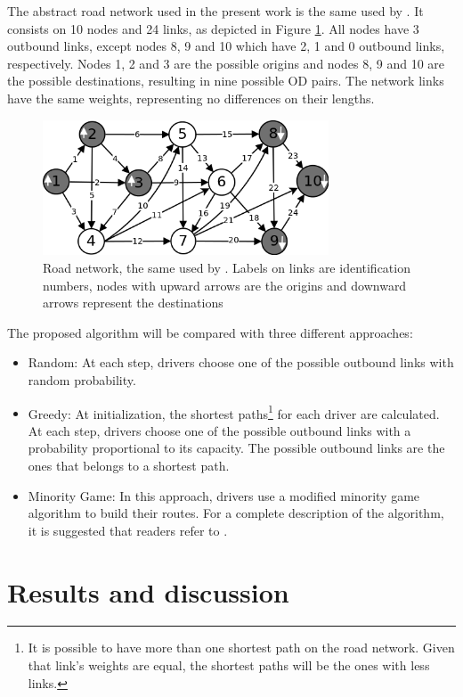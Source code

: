 \documentclass[12pt]{llncs}
\begin{document}
The abstract road network used in the present work is the same used by \cite{Galib&Moser2011}. It consists on 10 nodes and 24 links, as depicted in Figure \ref{fig:roadnetwork}. All nodes have 3 outbound links, except nodes 8, 9 and 10 which have 2, 1 and 0 outbound links, respectively. Nodes 1, 2 and 3 are the possible origins and nodes 8, 9 and 10 are the possible destinations, resulting in nine possible OD pairs. The network links have the same weights, representing no differences on their lengths.

\begin{figure}[ht]
    \centerline{\includegraphics[width=8.5cm]{img/roadnetwork.png}}
    \caption{Road network, the same used by \cite{Galib&Moser2011}. Labels on links are identification numbers, nodes with upward arrows are the origins and downward arrows represent the destinations}
    \label{fig:roadnetwork}
\end{figure}

The proposed algorithm will be compared with three different approaches:

\begin{itemize}
  \item Random: At each step, drivers choose one of the possible outbound links with random probability.
  \item Greedy: At initialization, the shortest paths\footnote{It is possible to have more than one shortest path on the road network. Given that link's weights are equal, the shortest paths will be the ones with less links.} for each driver are calculated. At each step, drivers choose one of the possible outbound links with a probability proportional to its capacity. The possible outbound links are the ones that belongs to a shortest path.
  \item Minority Game: In this approach, drivers use a modified minority game algorithm to build their routes. For a complete description of the algorithm, it is suggested that readers refer to \cite{Galib&Moser2011}.
\end{itemize}

\section{Results and discussion}
\label{sec:results}
\end{document}
